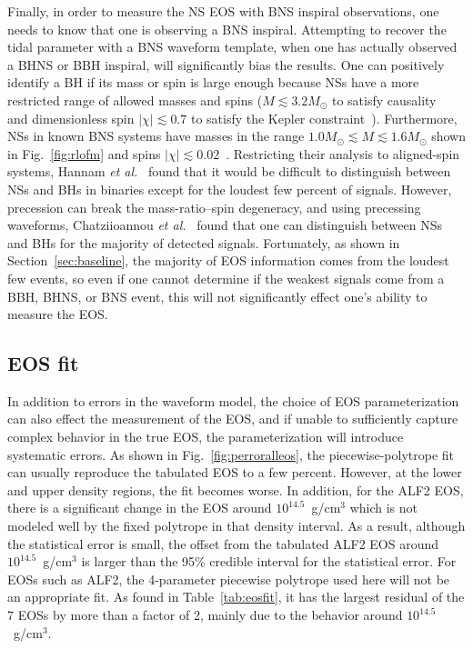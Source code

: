 \documentclass[twocolumn,prd,amssymb,aps,nofootinbib,showpacs,epsf]{revtex4}
\begin{document}
Finally, in order to measure the NS EOS with BNS inspiral observations, one needs to know that one is observing a BNS inspiral. Attempting to recover the tidal parameter with a BNS waveform template, when one has actually observed a BHNS or BBH inspiral, will significantly bias the results. One can positively identify a BH if its mass or spin is large enough because NSs have a more restricted range of allowed masses and spins ($M \lesssim 3.2M_\odot$ to satisfy causality~\cite{RhoadesRuffini1974} and dimensionless spin $| \chi | \lesssim 0.7$ to satisfy the Kepler constraint~\cite{CookShapiroTeukolsky1994}). Furthermore, NSs in known BNS systems have masses in the range $1.0M_\odot \lesssim M \lesssim 1.6M_\odot$ shown in Fig.~\ref{fig:rlofm} and spins $|\chi| \lesssim 0.02$~\cite{Favata2014}.  Restricting their analysis to aligned-spin systems, Hannam {\it et al.}~\cite{HannamBrownFairhurst2013} found that it would be difficult to distinguish between NSs and BHs in binaries except for the loudest few percent of signals. However, precession can break the mass-ratio--spin degeneracy, and using precessing waveforms, Chatziioannou {\it et al.}~\cite{ChatziioannouCornishKlein2014} found that one can distinguish between NSs and BHs for the majority of detected signals. Fortunately, as shown in Section~\ref{sec:baseline}, the majority of EOS information comes from the loudest few events, so even if one cannot determine if the weakest signals come from a BBH, BHNS, or BNS event, this will not significantly effect one's ability to measure the EOS.

\subsection{EOS fit}
\label{sec:systematicEOS}

In addition to errors in the waveform model, the choice of EOS parameterization can also effect the measurement of the EOS, and if unable to sufficiently capture complex behavior in the true EOS, the parameterization will introduce systematic errors. As shown in Fig.~\ref{fig:perroralleos}, the piecewise-polytrope fit can usually reproduce the tabulated EOS to a few percent. However, at the lower and upper density regions, the fit becomes worse. In addition, for the ALF2 EOS, there is a significant change in the EOS around $10^{14.5}$~g/cm$^3$ which is not modeled well by the fixed polytrope in that density interval. As a result, although the statistical error is small, the offset from the tabulated ALF2 EOS around $10^{14.5}$~g/cm$^3$ is larger than the 95\% credible interval for the statistical error. For EOSs such as ALF2, the 4-parameter piecewise polytrope used here will not be an appropriate fit. As found in Table~\ref{tab:eosfit}, it has the largest residual of the 7 EOSs by more than a factor of 2, mainly due to the behavior around $10^{14.5}$~g/cm$^3$. 
\end{document}
